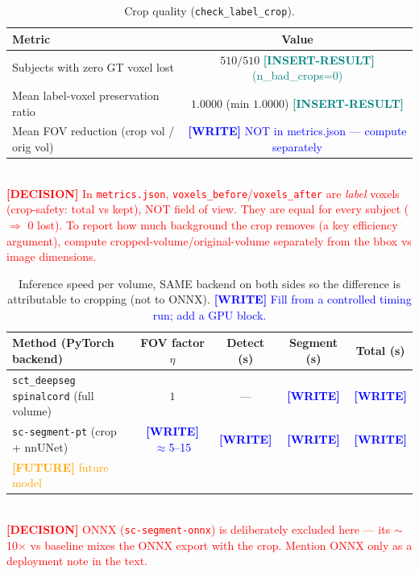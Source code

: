 \documentclass[11pt]{article}
\newcommand{\WRITE}[1]{\textcolor{blue}{\textbf{[WRITE]} #1}}
\newcommand{\RESULT}[1]{\textcolor{teal}{\textbf{[INSERT-RESULT]} #1}}
\newcommand{\FUTURE}[1]{\textcolor{orange}{\textbf{[FUTURE]} #1}}
\newcommand{\DECISION}[1]{\textcolor{red}{\textbf{[DECISION]} #1}}
\begin{document}
\begin{table}[t]\centering
  \caption{Crop quality (\texttt{check\_label\_crop}).}
  \label{tab:crop}
  \begin{tabular}{lc}
    \toprule
    Metric & Value \\
    \midrule
    Subjects with zero GT voxel lost            & $510/510$ \RESULT{(n\_bad\_crops=0)} \\
    Mean label-voxel preservation ratio         & $1.0000$ (min $1.0000$) \RESULT{} \\
    Mean FOV reduction (crop vol / orig vol)     & \WRITE{NOT in metrics.json --- compute separately} \\
    \bottomrule
  \end{tabular}
  \\[2pt]\footnotesize \DECISION{In \texttt{metrics.json},
  \texttt{voxels\_before}/\texttt{voxels\_after} are \emph{label} voxels
  (crop-safety: total vs kept), NOT field of view. They are equal for every
  subject ($\Rightarrow$ 0 lost). To report how much background the crop
  removes (a key efficiency argument), compute cropped-volume/original-volume
  separately from the bbox vs image dimensions.}
\end{table}

\begin{table}[t]\centering
  \caption{Inference speed per volume, SAME backend on both sides so the
  difference is attributable to cropping (not to ONNX). \WRITE{Fill from a
  controlled timing run; add a GPU block.}}
  \label{tab:speed}
  \begin{tabular}{lcccc}
    \toprule
    Method (PyTorch backend) & FOV factor $\eta$ & Detect (s) & Segment (s) & Total (s) \\
    \midrule
    \texttt{sct\_deepseg spinalcord} (full volume) & $1$ & --- & \WRITE{} & \WRITE{} \\
    \texttt{sc-segment-pt} (crop + nnUNet)         & \WRITE{$\approx$5--15} & \WRITE{} & \WRITE{} & \WRITE{} \\
    \FUTURE{future model}                          &     &     &     &     \\
    \bottomrule
  \end{tabular}
  \\[2pt]\footnotesize \DECISION{ONNX (\texttt{sc-segment-onnx}) is deliberately
  excluded here --- its $\sim$10$\times$ vs baseline mixes the ONNX export with
  the crop. Mention ONNX only as a deployment note in the text.}
\end{table}
\end{document}

